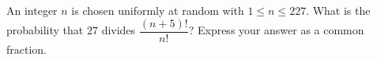 An integer $n$ is chosen uniformly at random with $1\le n\le227$. What is the probability that $27$ divides $\dfrac{(n+5)!}{n!}$? Express your answer as a common fraction.

